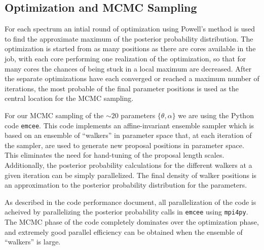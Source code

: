 \documentclass[11pt,preprint]{aastex}
\begin{document}
\subsection{Optimization and MCMC Sampling}
For each spectrum an intial round of optimization using Powell's method is used to find the approximate maximum of the posterior probability distribution. 
The optimization is started from as many positions as there are cores available in the job, with each core performing one realization of the optimization, so that for many cores the chances of being stuck in a local maximum are decreased.
After the separate optimizations have each converged or reached a maximum number of iterations, the most probable of the final parameter positions is used as the central location for the MCMC sampling.  

For our MCMC sampling of the $\sim 20$ parameters $\{\theta, \alpha\}$ we are using the Python code \texttt{emcee}.  
This code implements an affine-invariant ensemble sampler \citep{goodman_weare} which is based on an ensemble of ``walkers'' in parameter space that, at each iteration of the sampler, are used to generate new proposal positions in parameter space.  
This eliminates the need for hand-tuning of the proposal length scales.  
Additionally, the posterior probability calculations for the different walkers at a given iteration can be simply parallelized.  The final density of walker positions is an approximation to the posterior probability distribution for the parameters.

As described in the code performance document, all parallelization of the code is acheived by parallelizing the posterior probability calls in \texttt{emcee} using \texttt{mpi4py}.  
The MCMC phase of the code completely dominates over the optimization phase, and extremely good parallel efficiency can be obtained when the ensemble of ``walkers'' is large.




\end{document}
